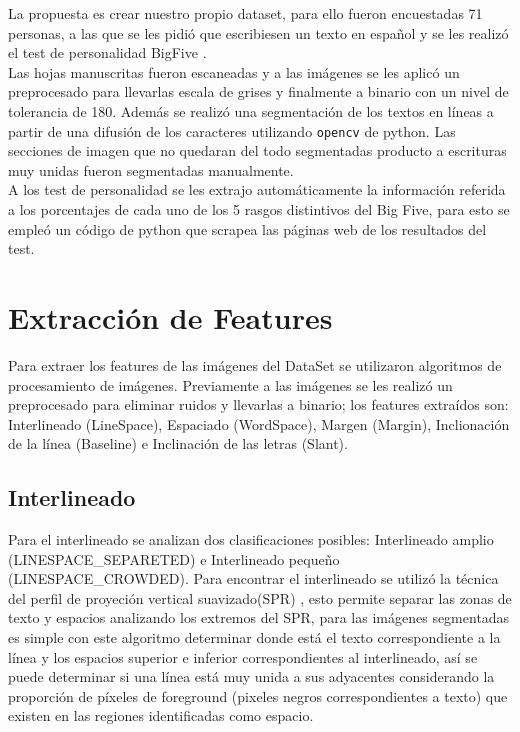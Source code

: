 \documentclass[10pt, a4paper]{article}
\begin{document}
        La propuesta es crear nuestro propio dataset, para ello fueron encuestadas 71 personas, a las que se les pidi\'o que escribiesen un texto 
        en espa\~nol y se les realiz\'o el test de personalidad BigFive \cite{bigfivetest}. \\ 

        Las hojas manuscritas fueron escaneadas y a las im\'agenes se les aplic\'o un preprocesado para llevarlas escala de grises y finalmente a binario con un nivel de tolerancia de 180. Adem\'as se 
        realiz\'o una segmentaci\'on de los textos en l\'ineas a partir de una difusi\'on de los caracteres utilizando \texttt{opencv} de python. Las secciones de imagen que no quedaran 
        del todo segmentadas producto a escrituras muy unidas fueron segmentadas manualmente.\\ 

        A los test de personalidad se les extrajo autom\'aticamente la informaci\'on referida a los porcentajes de cada uno 
        de los 5 rasgos distintivos del Big Five, para esto se emple\'o un c\'odigo de python que scrapea las p\'aginas web de los resultados del test.\\ 

    \section{Extracci\'on de Features}
        Para extraer los features de las im\'agenes del DataSet se utilizaron algoritmos de procesamiento de im\'agenes. Previamente a las im\'agenes se les realiz\'o un 
        preprocesado para eliminar ruidos y llevarlas a binario; los features extra\'idos son: Interlineado (LineSpace), Espaciado (WordSpace), Margen (Margin), Inclionaci\'on de la l\'inea (Baseline) e Inclinaci\'on de las letras (Slant). 

        \subsection{Interlineado} 

            Para el interlineado se analizan dos clasificaciones posibles: Interlineado amplio (LINESPACE\_SEPARETED) e Interlineado peque\~no (LINESPACE\_CROWDED). Para encontrar el interlineado se utiliz\'o la t\'ecnica del perfil 
            de proyeci\'on vertical suavizado(SPR) \cite{gavrilescu2018predicting}, esto permite separar las zonas de texto y espacios analizando los extremos del SPR, para las im\'agenes segmentadas es simple con este algoritmo determinar donde est\'a el texto correspondiente a la l\'inea y los espacios superior e inferior
            correspondientes al interlineado, as\'i se puede determinar si una l\'inea est\'a muy unida a sus adyacentes considerando la proporci\'on de p\'ixeles de foreground (pixeles negros correspondientes a texto) que existen en 
            las regiones identificadas como espacio.
\end{document}
